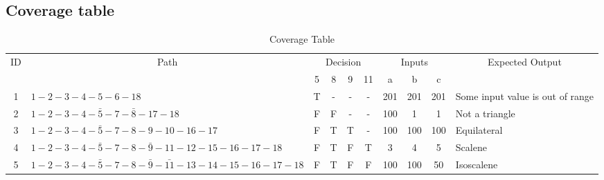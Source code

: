 \documentclass[12pt,a4paper]{article}
\newcommand{\outbound}{Some input value is out of range}
\newcommand{\nottriangle}{Not a triangle}
\newcommand{\equ}{Equilateral}
\newcommand{\sca}{Scalene}
\newcommand{\iso}{Isoscalene}
\begin{document}
\newpage
\begin{landscape}
    \section{Coverage table}

    \begin{table}[hb!]
        \caption{Coverage Table}
        \label{table:coveragetable}
        \begin{center}
            \begin{tabular}[p]{ | c | l | *{7}{c|} l |}
                \hline
                \multirow{2}{*}{ID} & \multicolumn{1}{c}{\multirow{2}{*}{Path}} & \multicolumn{4}{|c|}{Decision} & \multicolumn{3}{|c|}{Inputs} & \multicolumn{1}{c|}{\multirow{2}{*}{Expected Output}} \\ \cline{3-9}
                                    &                                           & 5 & 8 & 9 & 11 & a   & b   & c   &                \\ \hline
                1 & $1-2-3-4-5-6-18$                                            & T & - & - & -  & 201 & 201 & 201 & \outbound      \\ \hline
                2 & $1-2-3-4-\bar{5}-7-\bar{8}-17-18$                           & F & F & - & -  & 100 & 1   & 1   & \nottriangle   \\ \hline
                3 & $1-2-3-4-\bar{5}-7-8-9-10-16-17$                            & F & T & T & -  & 100 & 100 & 100 & \equ           \\ \hline
                4 & $1-2-3-4-\bar{5}-7-8-\bar{9}-11-12-15-16-17-18$             & F & T & F & T  &   3 &   4 &   5 & \sca           \\ \hline
                5 & $1-2-3-4-\bar{5}-7-8-\bar{9}-\bar{11}-13-14-15-16-17-18$    & F & T & F & F  & 100 & 100 &  50 & \iso           \\ \hline
            \end{tabular}
        \end{center}
    \end{table}

\end{landscape}
\end{document}
